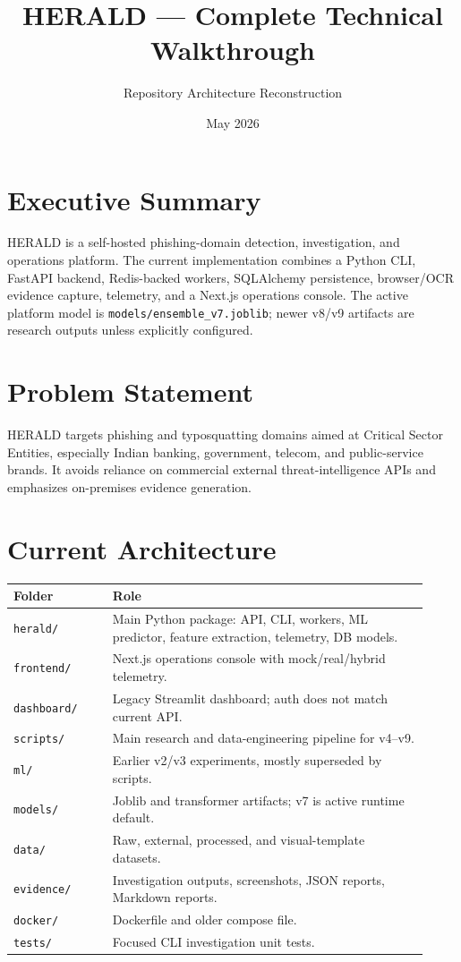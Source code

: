 \documentclass[11pt]{article}
\title{HERALD --- Complete Technical Walkthrough}
\author{Repository Architecture Reconstruction}
\date{May 2026}
\begin{document}
\maketitle
\tableofcontents
\newpage

\section{Executive Summary}
HERALD is a self-hosted phishing-domain detection, investigation, and operations platform. The current implementation combines a Python CLI, FastAPI backend, Redis-backed workers, SQLAlchemy persistence, browser/OCR evidence capture, telemetry, and a Next.js operations console. The active platform model is \texttt{models/ensemble\_v7.joblib}; newer v8/v9 artifacts are research outputs unless explicitly configured.

\section{Problem Statement}
HERALD targets phishing and typosquatting domains aimed at Critical Sector Entities, especially Indian banking, government, telecom, and public-service brands. It avoids reliance on commercial external threat-intelligence APIs and emphasizes on-premises evidence generation.

\section{Current Architecture}
\begin{longtable}{p{0.22\linewidth}p{0.70\linewidth}}
\toprule
Folder & Role \\
\midrule
\texttt{herald/} & Main Python package: API, CLI, workers, ML predictor, feature extraction, telemetry, DB models. \\
\texttt{frontend/} & Next.js operations console with mock/real/hybrid telemetry. \\
\texttt{dashboard/} & Legacy Streamlit dashboard; auth does not match current API. \\
\texttt{scripts/} & Main research and data-engineering pipeline for v4--v9. \\
\texttt{ml/} & Earlier v2/v3 experiments, mostly superseded by scripts. \\
\texttt{models/} & Joblib and transformer artifacts; v7 is active runtime default. \\
\texttt{data/} & Raw, external, processed, and visual-template datasets. \\
\texttt{evidence/} & Investigation outputs, screenshots, JSON reports, Markdown reports. \\
\texttt{docker/} & Dockerfile and older compose file. \\
\texttt{tests/} & Focused CLI investigation unit tests. \\
\bottomrule
\end{longtable}
\end{document}
